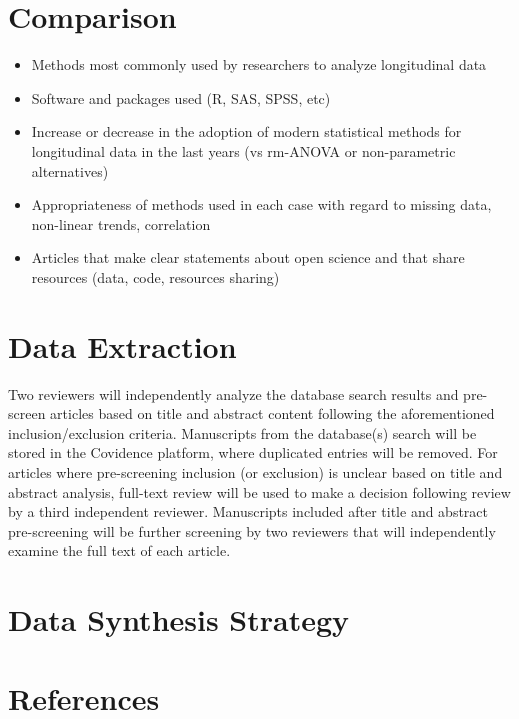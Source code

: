 \documentclass[
]{article}
\begin{document}
\hypertarget{comparison}{%
\section{Comparison}\label{comparison}}

\begin{itemize}
\item
  Methods most commonly used by researchers to analyze longitudinal data
\item
  Software and packages used (R, SAS, SPSS, etc)
\item
  Increase or decrease in the adoption of modern statistical methods for
  longitudinal data in the last  years (vs rm-ANOVA or
  non-parametric alternatives)
\item
  Appropriateness of methods used in each case with regard to missing
  data, non-linear trends, correlation
\item
  Articles that make clear statements about open science and that share
  resources (data, code, resources sharing)
\end{itemize}

\hypertarget{data-extraction}{%
\section{Data Extraction}\label{data-extraction}}

Two reviewers will independently analyze the database search results and
pre-screen articles based on title and abstract content following the
aforementioned inclusion/exclusion criteria. Manuscripts from the
database(s) search will be stored in the Covidence platform, where
duplicated entries will be removed. For articles where pre-screening
inclusion (or exclusion) is unclear based on title and abstract
analysis, full-text review will be used to make a decision following
review by a third independent reviewer. Manuscripts included after title
and abstract pre-screening will be further screening by two reviewers
that will independently examine the full text of each article.

\hypertarget{data-synthesis-strategy}{%
\section{Data Synthesis Strategy}\label{data-synthesis-strategy}}

\hypertarget{references}{%
\section{References}\label{references}}
\end{document}
